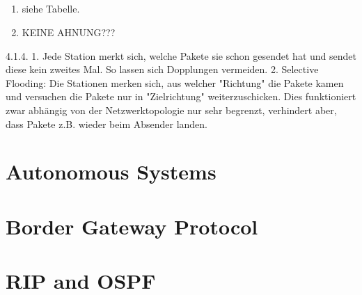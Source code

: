 \documentclass[a4paper,
			llpt,
			solution,
			accentcolor=tud2d,
			colorbacktitle
			]
			{tudexercise}
\newcommand{\MiBs}{\mathrm{MiB}/\mathrm{s}}
\newcommand{\8}{$\infty$}
\begin{document}
\subsection{}
\begin{enumerate}

\item siehe Tabelle.


\item KEINE AHNUNG???

\end{enumerate}
4.1.4.
      1. Jede Station merkt sich, welche Pakete sie schon gesendet hat und sendet diese kein zweites Mal. So lassen sich Dopplungen vermeiden.
      2. Selective Flooding: Die Stationen merken sich, aus welcher "Richtung" die Pakete kamen und versuchen die Pakete nur in "Zielrichtung" weiterzuschicken. Dies funktioniert zwar abhängig von der Netzwerktopologie nur sehr begrenzt, verhindert aber, dass Pakete z.B. wieder beim Absender landen.
\section{Autonomous Systems}
\section{Border Gateway Protocol}
\section{RIP and OSPF}
\end{document}
